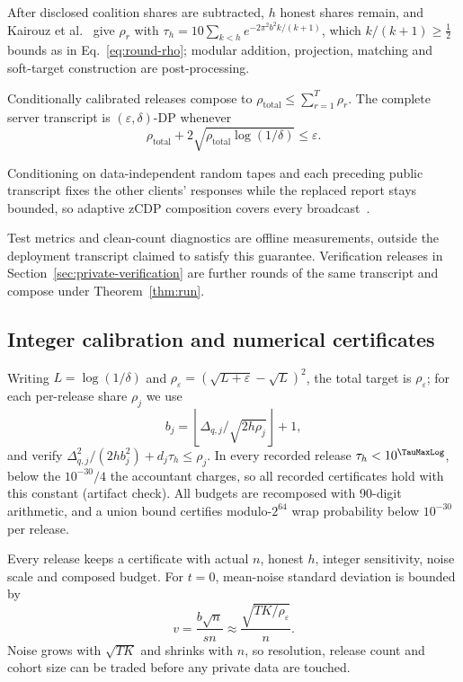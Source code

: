 After disclosed coalition shares are subtracted, $h$ honest shares remain,
and Kairouz et al.~\cite[Prop.~14, full version]{kairouz2021distributed} give
$\rho_r$ with $\tau_h=10\sum_{k<h}e^{-2\pi^2b^2k/(k+1)}$, which
$k/(k+1)\ge\frac12$ bounds as in Eq.~\eqref{eq:round-rho}; modular addition, projection, matching and
soft-target construction are post-processing.

\begin{theorem}
\label{thm:run}
Conditionally calibrated releases compose to
$\rho_{\mathrm{total}}\le\sum_{r=1}^T\rho_r$.
The complete server transcript is $(\varepsilon,\delta)$-DP whenever
\begin{equation}
\rho_{\mathrm{total}}+2\sqrt{\rho_{\mathrm{total}}\log(1/\delta)}
\le\varepsilon.
\label{eq:accounting}
\end{equation}
\end{theorem}

Conditioning on data-independent random tapes and each preceding public
transcript fixes the other clients' responses while the replaced report
stays bounded, so adaptive zCDP composition covers every
broadcast~\cite{bun2016concentrated}.

Test metrics and clean-count diagnostics are offline measurements,
outside the deployment transcript claimed to satisfy this guarantee.
Verification releases in Section~\ref{sec:private-verification} are further
rounds of the same transcript and compose under Theorem~\ref{thm:run}.

\subsection{Integer calibration and numerical certificates}

Writing $L=\log(1/\delta)$ and
$\rho_\varepsilon=(\sqrt{L+\varepsilon}-\sqrt L)^2$, the total target is
$\rho_\varepsilon$; for each per-release share $\rho_j$ we use
\begin{equation}
b_j=\left\lfloor\Delta_{q,j}/\sqrt{2h\rho_j}\right\rfloor+1,
\label{eq:integer-scale}
\end{equation}
and verify $\Delta_{q,j}^2/(2hb_j^2)+d_j\tau_h\le\rho_j$. In every
recorded release $\tau_h<10^{\TauMaxLog}$, below the $10^{-30}/4$ the
accountant charges, so all \TauCerts{} recorded certificates hold with this
constant (artifact check).
All budgets are recomposed with 90-digit arithmetic, and a union bound
certifies modulo-$2^{64}$ wrap probability below $10^{-30}$ per release.

Every release keeps a certificate with actual $n$, honest $h$, integer
sensitivity, noise scale and composed budget. For $t=0$, mean-noise standard deviation is bounded by
\begin{equation}
v=\frac{b\sqrt n}{sn}\approx\frac{\sqrt{TK/\rho_\varepsilon}}{n}.
\label{eq:design-budget}
\end{equation}
Noise grows with $\sqrt{TK}$ and shrinks with $n$, so resolution, release
count and cohort size can be traded before any private data are touched.
